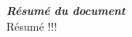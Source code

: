 \thispagestyle{empty}
\vspace*{10mm}

\textbf{\emph{\textcolor{onitu}{\large{Résumé du document} } } }\\

Résumé !!!

\clearpage

